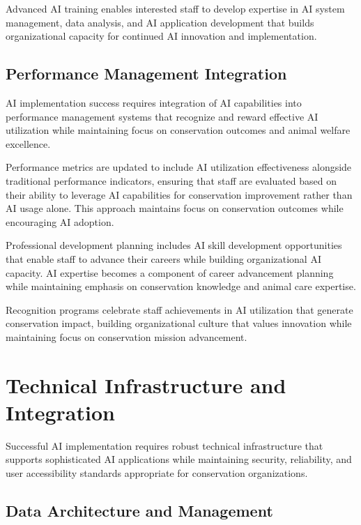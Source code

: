 \documentclass[
  Letterpaper,
]{scrbook}
\begin{document}
Advanced AI training enables interested staff to develop expertise in AI
system management, data analysis, and AI application development that
builds organizational capacity for continued AI innovation and
implementation.

\subsection{Performance Management
Integration}\label{performance-management-integration}

AI implementation success requires integration of AI capabilities into
performance management systems that recognize and reward effective AI
utilization while maintaining focus on conservation outcomes and animal
welfare excellence.

Performance metrics are updated to include AI utilization effectiveness
alongside traditional performance indicators, ensuring that staff are
evaluated based on their ability to leverage AI capabilities for
conservation improvement rather than AI usage alone. This approach
maintains focus on conservation outcomes while encouraging AI adoption.

Professional development planning includes AI skill development
opportunities that enable staff to advance their careers while building
organizational AI capacity. AI expertise becomes a component of career
advancement planning while maintaining emphasis on conservation
knowledge and animal care expertise.

Recognition programs celebrate staff achievements in AI utilization that
generate conservation impact, building organizational culture that
values innovation while maintaining focus on conservation mission
advancement.

\section{Technical Infrastructure and
Integration}\label{technical-infrastructure-and-integration}

Successful AI implementation requires robust technical infrastructure
that supports sophisticated AI applications while maintaining security,
reliability, and user accessibility standards appropriate for
conservation organizations.

\subsection{Data Architecture and
Management}\label{data-architecture-and-management}
\end{document}
